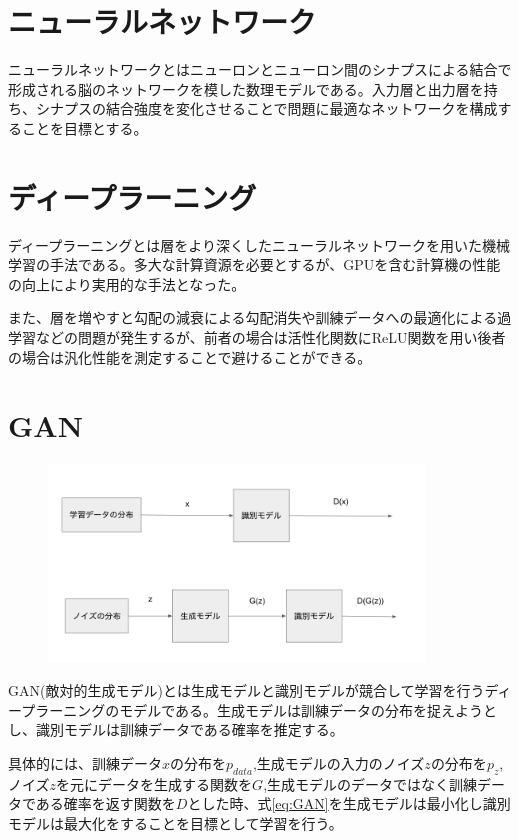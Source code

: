 \section{ニューラルネットワーク}
ニューラルネットワークとはニューロンとニューロン間のシナプスによる結合で形成される脳のネットワークを模した数理モデルである。入力層と出力層を持ち、シナプスの結合強度を変化させることで問題に最適なネットワークを構成することを目標とする。\par

\section{ディープラーニング}

ディープラーニングとは層をより深くしたニューラルネットワークを用いた機械学習の手法である。多大な計算資源を必要とするが、GPUを含む計算機の性能の向上により実用的な手法となった。\par
また、層を増やすと勾配の減衰による勾配消失や訓練データへの最適化による過学習などの問題が発生するが、前者の場合は活性化関数にReLU関数を用い後者の場合は汎化性能を測定することで避けることができる。\par


\section{GAN}

\begin{figure}[h]
    \includegraphics[width=10.0cm]{figure/GAN.png}
\end{figure}

GAN(敵対的生成モデル)とは生成モデルと識別モデルが競合して学習を行うディープラーニングのモデルである。生成モデルは訓練データの分布を捉えようとし、識別モデルは訓練データである確率を推定する。\par
具体的には、訓練データ$x$の分布を$p_{data}$,生成モデルの入力のノイズ$z$の分布を$p_z$,ノイズ$z$を元にデータを生成する関数を$G$,生成モデルのデータではなく訓練データである確率を返す関数を$D$とした時、式\ref{eq:GAN}を生成モデルは最小化し識別モデルは最大化をすることを目標として学習を行う\cite{GAN}。


